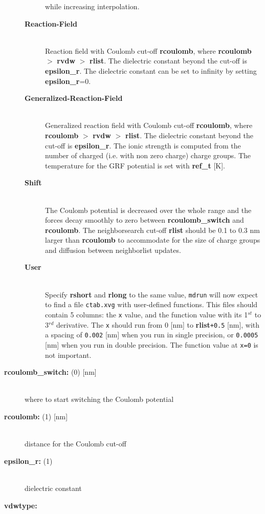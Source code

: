 \begin{description}
\begin{description}
while increasing interpolation.
\item[{\bf Reaction-Field}]\mbox{}\\
Reaction field with Coulomb cut-off {\bf rcoulomb},
where {\bf rcoulomb} {\tt $>$} {\bf rvdw} {\tt $>$} {\bf rlist}.
The dielectric constant beyond the cut-off is {\bf epsilon\_r}.
The dielectric constant can be set to infinity by setting {\bf epsilon\_r}=0.
\item[{\bf Generalized-Reaction-Field}]\mbox{}\\
Generalized reaction field with Coulomb cut-off {\bf rcoulomb},
where {\bf rcoulomb} {\tt $>$} {\bf rvdw} {\tt $>$} {\bf rlist}.
The dielectric constant beyond the cut-off is {\bf epsilon\_r}.
The ionic strength is computed from the number of charged 
(i.e. with non zero charge) charge groups.
The temperature for the GRF potential is set with 
{\bf ref\_t} [K].
\item[{\bf Shift}]\mbox{}\\
The Coulomb
potential is decreased over the whole range and the forces decay smoothly
to zero between {\bf rcoulomb\_switch} and {\bf rcoulomb}.
The neighborsearch cut-off {\bf rlist} should be 0.1 to 0.3 nm larger than
{\bf rcoulomb} to accommodate for the size of charge groups and diffusion
between neighborlist updates.
\item[{\bf User}]\mbox{}\\
Specify {\bf rshort} and {\bf rlong} to the same value, {\tt mdrun}
will now expect to find a file {\tt ctab.xvg} with user-defined functions.
This files should contain 5 columns:
the {\tt x} value, and the function value with its 1$^{st}$
to 3$^{rd}$ derivative. The {\tt x} should run from 0 [nm] to
{\bf rlist}{\tt +0.5} [nm], with a spacing of {\tt 0.002}
[nm] when you run in single precision, or {\tt 0.0005} [nm] when
you run in double precision. The function value at {\tt x=0} is not
important.
\end{description}
\item[{\bf rcoulomb\_switch: }(0) {[nm]}]\mbox{}\\
where to start switching the Coulomb potential
\item[{\bf rcoulomb: }(1) {[nm]}]\mbox{}\\
distance for the Coulomb cut-off
\item[{\bf epsilon\_r: }(1)]\mbox{}\\
dielectric constant
\item[{\bf vdwtype:}]\mbox{}\\
\vspace{-2ex}\begin{description}

\end{description}
\end{description}
